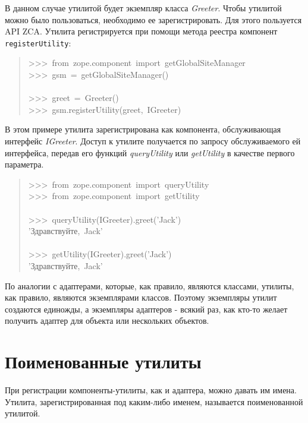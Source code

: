 \documentclass[14pt,a4paper,openany,twoside,final]{extbook}
\providecommand*{\DUroletitlereference}[1]{\textsl{#1}}
\begin{document}
В данном случае утилитой будет экземпляр класса \DUroletitlereference{Greeter}.  Чтобы
утилитой можно было пользоваться, необходимо ее зарегистрировать.  Для
этого пользуется API ZCA.  Утилита регистрируется при помощи метода
реестра компонент \texttt{registerUtility}:

\begin{quote}{\ttfamily \raggedright \noindent
>{}>{}>~from~zope.component~import~getGlobalSiteManager\\
>{}>{}>~gsm~=~getGlobalSiteManager()\\
~\\
>{}>{}>~greet~=~Greeter()\\
>{}>{}>~gsm.registerUtility(greet,~IGreeter)
}
\end{quote}

В этом примере утилита зарегистрирована как компонента, обслуживающая
интерфейс \DUroletitlereference{IGreeter}.  Доступ к утилите получается по запросу
обслуживаемого ей интерфейса, передав его функций \DUroletitlereference{queryUtility} или
\DUroletitlereference{getUtility} в качестве первого параметра.

\begin{quote}{\ttfamily \raggedright \noindent
>{}>{}>~from~zope.component~import~queryUtility\\
>{}>{}>~from~zope.component~import~getUtility\\
~\\
>{}>{}>~queryUtility(IGreeter).greet('Jack')\\
'Здравствуйте,~Jack'\\
~\\
>{}>{}>~getUtility(IGreeter).greet('Jack')\\
'Здравствуйте,~Jack'
}
\end{quote}

По аналогии с адаптерами, которые, как правило, являются классами,
утилиты, как правило, являются экземплярами классов.  Поэтому
экземпляры утилит создаются единожды, а экземпляры адаптеров - всякий
раз, как кто-то желает получить адаптер для объекта или нескольких
объектов.


\section{Поименованные утилиты%
  \label{id42}%
}

При регистрации компоненты-утилиты, как и адаптера, можно давать им
имена.  Утилита, зарегистрированная под каким-либо именем, называется
поименованной утилитой.
\end{document}
